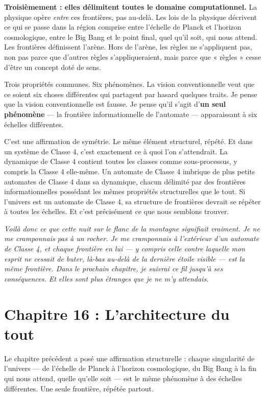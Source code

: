 \documentclass[11pt, twoside, openright]{book}
\begin{document}
\textbf{Troisièmement : elles délimitent toutes le domaine computationnel.} La physique opère \textit{entre} ces frontières, pas au-delà. Les lois de la physique décrivent ce qui se passe dans la région comprise entre l'échelle de Planck et l'horizon cosmologique, entre le Big Bang et le point final, quel qu'il soit, qui nous attend. Les frontières définissent l'arène. Hors de l'arène, les règles ne s'appliquent pas, non pas parce que d'autres règles s'appliqueraient, mais parce que « règles » cesse d'être un concept doté de sens.

Trois propriétés communes. Six phénomènes. La vision conventionnelle veut que ce soient six choses différentes qui partagent par hasard quelques traits. Je pense que la vision conventionnelle est fausse. Je pense qu'il s'agit d'\textbf{un seul phénomène} --- la frontière informationnelle de l'automate --- apparaissant à six échelles différentes.

C'est une affirmation de symétrie. Le même élément structurel, répété. Et dans un système de Classe 4, c'est exactement ce à quoi l'on s'attendrait. La dynamique de Classe 4 contient toutes les classes comme sous-processus, y compris la Classe 4 elle-même. Un automate de Classe 4 imbrique de plus petits automates de Classe 4 dans sa dynamique, chacun délimité par des frontières informationnelles possédant les mêmes propriétés structurelles que le tout. Si l'univers est un automate de Classe 4, sa structure de frontières devrait se répéter à toutes les échelles. Et c'est précisément ce que nous semblons trouver.


\textit{Voilà donc ce que cette nuit sur le flanc de la montagne signifiait vraiment. Je ne me cramponnais pas à un rocher. Je me cramponnais à l'extérieur d'un automate de Classe 4, et chaque frontière en lui --- y compris celle contre laquelle mon esprit ne cessait de buter, là-bas au-delà de la dernière étoile visible --- est la même frontière. Dans le prochain chapitre, je suivrai ce fil jusqu'à ses conséquences. Et elles sont plus étranges que je ne m'y attendais.}


\chapter*{Chapitre 16 : L'architecture du tout}

Le chapitre précédent a posé une affirmation structurelle : chaque singularité de l'univers --- de l'échelle de Planck à l'horizon cosmologique, du Big Bang à la fin qui nous attend, quelle qu'elle soit --- est le même phénomène à des échelles différentes. Une seule frontière, répétée partout.
\end{document}
